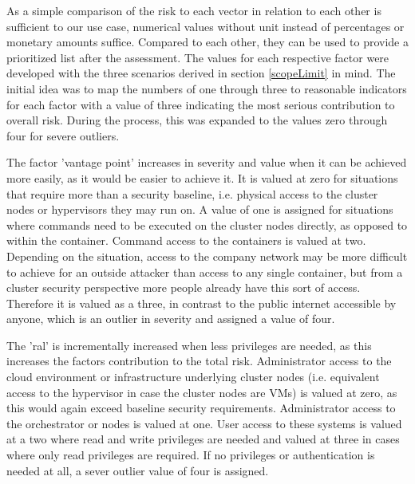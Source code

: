 As a simple comparison of the risk to each vector in relation to each other is sufficient to our use case, numerical values without unit instead of percentages or monetary amounts suffice. Compared to each other, they can be used to provide a prioritized list after the assessment.
The values for each respective factor were developed with the three scenarios derived in section \ref{scopeLimit} in mind. 
The initial idea was to map the numbers of one through three to reasonable indicators for each factor with a value of three indicating the most serious contribution to overall risk. During the process, this was expanded to the values zero through four for severe outliers.

The factor 'vantage point' increases in severity and value when it can be achieved more easily, as it would be easier to achieve it. It is valued at zero for situations that require more than a security baseline, i.e. physical access to the cluster nodes or hypervisors they may run on. A value of one is assigned for situations where commands need to be executed on the cluster nodes directly, as opposed to within the container. Command access to the containers is valued at two. Depending on the situation, access to the company network may be more difficult to achieve for an outside attacker than access to any single container, but from a cluster security perspective more people already have this sort of access. Therefore it is valued as a three, in contrast to the public internet accessible by anyone, which is an outlier in severity and assigned a value of four.

The '\gls{ral}' is incrementally increased when less privileges are needed, as this increases the factors contribution to the total risk.
Administrator access to the cloud environment or infrastructure underlying cluster nodes (i.e. equivalent access to the hypervisor in case the cluster nodes are VMs) is valued at zero, as this would again exceed baseline security requirements. Administrator access to the orchestrator or nodes is valued at one. User access to these systems is valued at a two where read and write privileges are needed and valued at three in cases where only read privileges are required. If no privileges or authentication is needed at all, a sever outlier value of four is assigned.

